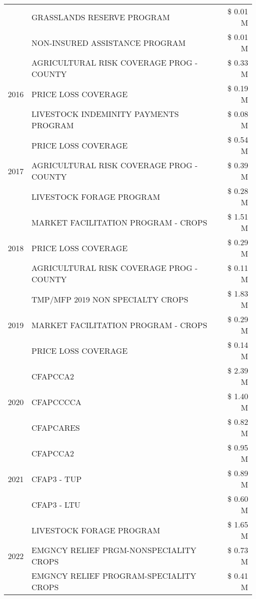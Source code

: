 \begin{tabular}{llr}
 & GRASSLANDS RESERVE PROGRAM & \$ 0.01 M \\
 & NON-INSURED ASSISTANCE PROGRAM & \$ 0.01 M \\
\cline{1-3}
\multirow[t]{3}{*}{2016} & AGRICULTURAL RISK COVERAGE PROG - COUNTY & \$ 0.33 M \\
 & PRICE LOSS COVERAGE & \$ 0.19 M \\
 & LIVESTOCK INDEMINITY PAYMENTS PROGRAM & \$ 0.08 M \\
\cline{1-3}
\multirow[t]{3}{*}{2017} & PRICE LOSS COVERAGE & \$ 0.54 M \\
 & AGRICULTURAL RISK COVERAGE PROG - COUNTY & \$ 0.39 M \\
 & LIVESTOCK FORAGE PROGRAM & \$ 0.28 M \\
\cline{1-3}
\multirow[t]{3}{*}{2018} & MARKET FACILITATION PROGRAM - CROPS & \$ 1.51 M \\
 & PRICE LOSS COVERAGE & \$ 0.29 M \\
 & AGRICULTURAL RISK COVERAGE PROG - COUNTY & \$ 0.11 M \\
\cline{1-3}
\multirow[t]{3}{*}{2019} & TMP/MFP 2019 NON SPECIALTY CROPS & \$ 1.83 M \\
 & MARKET FACILITATION PROGRAM - CROPS & \$ 0.29 M \\
 & PRICE LOSS COVERAGE & \$ 0.14 M \\
\cline{1-3}
\multirow[t]{3}{*}{2020} & CFAPCCA2 & \$ 2.39 M \\
 & CFAPCCCCA & \$ 1.40 M \\
 & CFAPCARES & \$ 0.82 M \\
\cline{1-3}
\multirow[t]{3}{*}{2021} & CFAPCCA2 & \$ 0.95 M \\
 & CFAP3 - TUP & \$ 0.89 M \\
 & CFAP3 - LTU & \$ 0.60 M \\
\cline{1-3}
\multirow[t]{3}{*}{2022} & LIVESTOCK FORAGE PROGRAM & \$ 1.65 M \\
 & EMGNCY RELIEF PRGM-NONSPECIALITY CROPS & \$ 0.73 M \\
 & EMGNCY RELIEF PROGRAM-SPECIALITY CROPS & \$ 0.41 M \\
\cline{1-3}
\bottomrule
\end{tabular}
